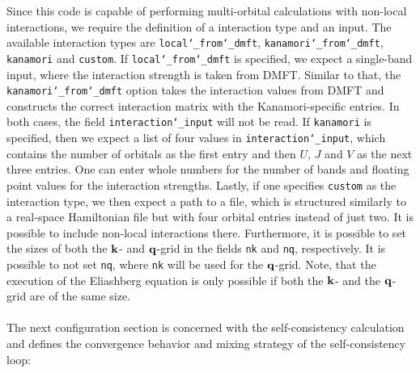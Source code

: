 \documentclass[../../main.tex]{subfiles}
\begin{document}
Since this code is capable of performing multi-orbital calculations with non-local interactions, we require the definition of a interaction type and an input. The available interaction types are \texttt{local\char`_from\char`_dmft}, \texttt{kanamori\char`_from\char`_dmft}, \texttt{kanamori} and \texttt{custom}. If \texttt{local\char`_from\char`_dmft} is specified, we expect a single-band input, where the interaction strength is taken from DMFT. Similar to that, the \texttt{kanamori\char`_from\char`_dmft} option takes the interaction values from DMFT and constructs the correct interaction matrix with the Kanamori-specific entries. In both cases, the field \texttt{interaction\char`_input} will not be read. If \texttt{kanamori} is specified, then we expect a list of four values in \texttt{interaction\char`_input}, which contains the number of orbitals as the first entry and then $U$, $J$ and $V$ as the next three entries. One can enter whole numbers for the number of bands and floating point values for the interaction strengths. Lastly, if one specifies \texttt{custom} as the interaction type, we then expect a path to a file, which is structured similarly to a real-space Hamiltonian file but with four orbital entries instead of just two. It is possible to include non-local interactions there. Furthermore, it is possible to set the sizes of both the $\textbf{k}$- and $\textbf{q}$-grid in the fields \texttt{nk} and \texttt{nq}, respectively. It is possible to not set \texttt{nq}, where \texttt{nk} will be used for the $\textbf{q}$-grid. Note, that the execution of the Eliashberg equation is only possible if both the $\textbf{k}$- and the $\textbf{q}$-grid are of the same size.
\\\\
The next configuration section is concerned with the self-consistency calculation and defines the convergence behavior and mixing strategy of the self-consistency loop:
\end{document}
